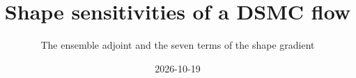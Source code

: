 \documentclass[10pt,aspectratio=169]{beamer}
\title{Shape sensitivities of a DSMC flow}
\subtitle{The ensemble adjoint and the seven terms of the shape gradient}
\date{2026-10-19}
\begin{document}
\begin{frame}
\titlepage
\end{frame}

\end{document}
